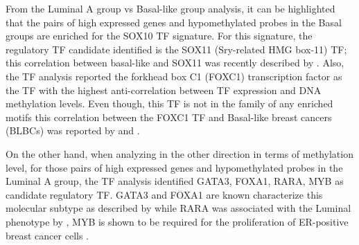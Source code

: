 From the  Luminal A group vs Basal-like group analysis, it can be highlighted that the pairs of high expressed genes and hypomethylated probes in the Basal groups are enriched for the SOX10 TF signature. For this signature, the regulatory TF candidate identified is the SOX11 (Sry-related HMG box-11) TF; this correlation between basal-like and SOX11 was recently described by . Also, the TF analysis  reported the forkhead box C1 (FOXC1) transcription factor as the TF with the highest anti-correlation between TF expression and DNA methylation levels. Even though, this TF is not in the family of any enriched motifs this correlation between the FOXC1 TF and Basal-like breast cancers (BLBCs) was reported by  and . 

On the other hand, when analyzing in the other direction in terms of methylation level, for  those pairs of high expressed genes and hypomethylated probes in the Luminal A group, the TF analysis identified GATA3, FOXA1, RARA, MYB as candidate regulatory TF. GATA3 and FOXA1 are known characterize this  molecular subtype  as described by  while RARA was associated with the Luminal phenotype by , MYB
is shown to be required for the proliferation of ER-positive breast cancer cells \cite{mitra2016cdk9}.



%  


